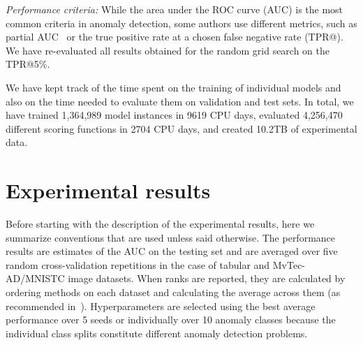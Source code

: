 \textit{Performance criteria:} While the area under the ROC curve (AUC) is the most common criteria in anomaly detection, some authors use different metrics, such as partial AUC~\cite{dodd2003partial} or the true positive rate at a chosen false negative rate (TPR@). We have re-evaluated all results obtained for the random grid search on the TPR@5\%.

We have kept track of the time spent on the training of individual models and also on the time needed to evaluate them on validation and test sets. In total, we have trained 1,364,989 model instances in 9619 CPU days, evaluated 4,256,470 different scoring functions in 2704 CPU days, and created 10.2TB of experimental data.

\section{Experimental results}
\label{sec:results}
Before starting with the description of the experimental results, here we summarize conventions that are used unless said otherwise. The performance results are estimates of the AUC on the testing set and are averaged over five random cross-validation repetitions in the case of tabular and MvTec-AD/MNISTC image datasets. When ranks are reported, they are calculated by ordering methods on each dataset and calculating the average across them (as recommended in~\cite{demvsar2006statistical}). Hyperparameters are selected using the best average performance over 5 seeds or individually over 10 anomaly classes because the individual class splits constitute different anomaly detection problems. 


